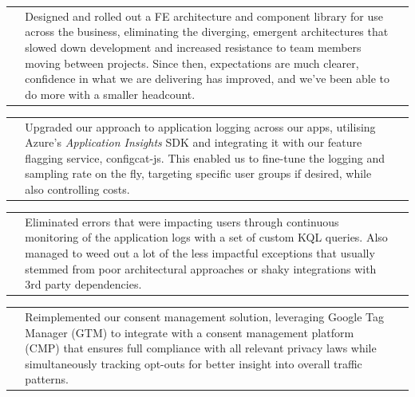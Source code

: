 \documentclass[letterpaper,11pt]{article}
\begin{document}
\vspace{-12pt}

\begin{tabular*}{6.6in}{p{0.2in}p{6.3in}p{0in}}
  
\, & {\small

       Designed and rolled out a FE architecture and component library for use across the business, eliminating the diverging, emergent architectures that slowed down development and increased resistance to team members moving between projects. Since then, expectations are much clearer, confidence in what we are delivering has improved, and we've been able to do more with a smaller headcount.
   
       } &
      \, \\

\end{tabular*}

\begin{tabular*}{6.6in}{p{0.2in}p{6.3in}p{0in}}
  
   \, &
       {\small

        Upgraded our approach to application logging across our apps, utilising Azure's \textit{Application Insights} SDK and integrating it with our feature flagging service, configcat-js. This enabled us to fine-tune the logging and sampling rate on the fly, targeting specific user groups if desired, while also controlling costs.
        
       } &
   \, \\
  
\end{tabular*}



\begin{tabular*}{6.6in}{p{0.2in}p{6.3in}p{0in}}

\, & {\small

       Eliminated errors that were impacting users through continuous monitoring of the application logs with a set of custom KQL queries. Also managed to weed out a lot of the less impactful exceptions that usually stemmed from poor architectural approaches or shaky integrations with 3rd party dependencies.
       
       } &
      \, \\

\end{tabular*}

\begin{tabular*}{6.6in}{p{0.2in}p{6.3in}p{0in}}
  
  \, & {\small

       Reimplemented our consent management solution, leveraging Google Tag Manager (GTM) to integrate with a consent management platform (CMP) that ensures full compliance with all relevant privacy laws while simultaneously tracking opt-outs for better insight into overall traffic patterns.
       
       } &
      \, \\
  
\end{tabular*}
\end{document}

